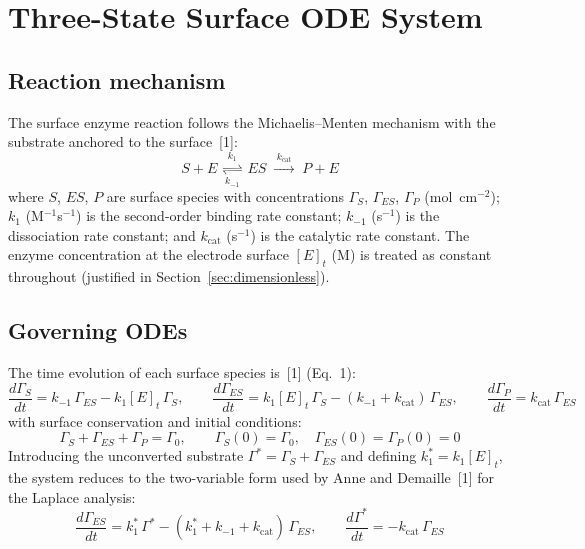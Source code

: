 \documentclass[10pt,a4paper]{article}
\numberwithin{equation}{section}
\newcommand{\cit}[1]{[#1]}
\newcommand{\kcat}{k_{\text{cat}}}
\newcommand{\GS}{\Gamma_S}
\newcommand{\GES}{\Gamma_{ES}}
\newcommand{\GP}{\Gamma_P}
\newcommand{\Gstar}{\Gamma^{*}}
\newcommand{\Gz}{\Gamma_0}
\begin{document}
\section{Three-State Surface ODE System}
\label{sec:ode}

\subsection{Reaction mechanism}

The surface enzyme reaction follows the Michaelis--Menten mechanism with the
substrate anchored to the surface~\cit{1}:
\begin{equation}
  S + E \;\underset{k_{-1}}{\overset{k_1}{\rightleftharpoons}}\; ES
           \;\xrightarrow{\;\kcat\;}\; P + E
  \label{eq:mechanism}
\end{equation}
where $S$, $ES$, $P$ are surface species with concentrations $\GS$, $\GES$,
$\GP$ (mol~cm$^{-2}$); $k_1$ (M$^{-1}$s$^{-1}$) is the second-order binding rate
constant; $k_{-1}$ (s$^{-1}$) is the dissociation rate constant; and $\kcat$
(s$^{-1}$) is the catalytic rate constant. The enzyme concentration at the
electrode surface $[E]_t$ (M) is treated as constant throughout (justified in
Section~\ref{sec:dimensionless}).

\subsection{Governing ODEs}

The time evolution of each surface species is~\cit{1} (Eq.~1):
\begin{equation}
  \label{eq:odes}
  \frac{d\GS}{dt}  = k_{-1}\,\GES - k_1[E]_t\,\GS, \qquad
  \frac{d\GES}{dt} = k_1[E]_t\,\GS - (k_{-1}+\kcat)\,\GES, \qquad
  \frac{d\GP}{dt}  = \kcat\,\GES
\end{equation}
with surface conservation and initial conditions:
\begin{equation}
  \label{eq:conservation}
  \GS + \GES + \GP = \Gz, \qquad
  \GS(0) = \Gz,\quad \GES(0) = \GP(0) = 0
\end{equation}
Introducing the unconverted substrate $\Gstar = \GS + \GES$ and defining
$k_1^* = k_1[E]_t$, the system reduces to the two-variable form used by
Anne and Demaille~\cit{1} for the Laplace analysis:
\begin{equation}
  \label{eq:reduced}
  \frac{d\GES}{dt} = k_1^*\,\Gstar - (k_1^* + k_{-1} + \kcat)\,\GES,
  \qquad
  \frac{d\Gstar}{dt} = -\kcat\,\GES
\end{equation}
\end{document}
